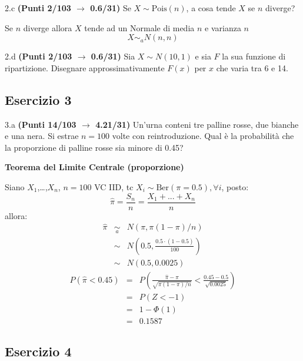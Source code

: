 \documentclass[
  11pt,
]{book}
\theoremstyle{mytheoremstyle}
\theoremstyle{mydefstyle}
\newenvironment{sol}
  {
  \begin{tcolorbox}[enhanced,breakable,arc=0.1mm,boxrule=1pt,colback=white,colframe=iblue,
  title=\bf \fontfamily{lmss}\selectfont \hspace{.5 cm} Soluzione,drop fuzzy shadow]

}{
\end{tcolorbox}
  }
\begin{document}
2.c \textbf{(Punti 2/103 \(\rightarrow\) 0.6/31)} Se \(X\sim\text{Pois} (n)\), a cosa tende \(X\) se \(n\) diverge?

\begin{sol}
Se \(n\) diverge allora \(X\) tende ad un Normale di media \(n\) e varianza \(n\)
\[
X\mathop\sim_a N(n,n)
\]

\end{sol}

2.d \textbf{(Punti 2/103 \(\rightarrow\) 0.6/31)} Sia \(X\sim N(10,1)\) e sia \(F\) la sua funzione di ripartizione. Disegnare approssimativamente \(F(x)\) per \(x\) che varia tra 6 e 14.

\subsection{Esercizio 3}\label{esercizio-3-24}

3.a \textbf{(Punti 14/103 \(\rightarrow\) 4.21/31)} Un'urna conteni tre palline rosse, due bianche e una nera. Si estrae \(n=100\) volte con reintroduzione. Qual è la probabilità che la proporzione di palline rosse sia minore di 0.45?

\begin{sol}
\textbf{Teorema del Limite Centrale (proporzione)}

Siano \(X_1\),\ldots,\(X_n\), \(n=100\) VC IID, tc \(X_i\sim\text{Ber}(\pi=0.5)\)\(,\forall i\), posto:
\[
      \hat\pi=\frac{S_n}n = \frac{X_1 + ... + X_n}n
      \]
allora:\begin{eqnarray*}
  \hat\pi & \mathop{\sim}\limits_{a}& N(\pi,\pi(1-\pi)/n) \\
  &\sim & N\left(0.5,\frac{0.5\cdot(1-0.5)}{100}\right) \\
     &\sim & N(0.5,0.0025) 
  \end{eqnarray*}\begin{eqnarray*}
      P( \hat\pi   <   0.45 ) 
        &=& P\left(  \frac { \hat\pi  -  \pi }{ \sqrt{\pi(1-\pi)/n} }  <  \frac { 0.45  -  0.5 }{\sqrt{ 0.0025 }} \right)  \\
                 &=& P\left(  Z   <   -1 \right) \\    
                 &=&  1-\Phi( 1 ) \\ &=&  0.1587 
      \end{eqnarray*}

\end{sol}

\subsection{Esercizio 4}\label{esercizio-4-24}
\end{document}
